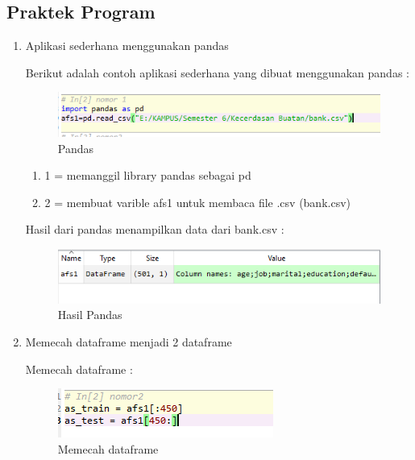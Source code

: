 \subsection{Praktek Program}
\begin{enumerate}
\item Aplikasi sederhana menggunakan pandas
	\par Berikut adalah contoh aplikasi sederhana yang dibuat menggunakan pandas :
	
		\begin{figure}[ht]
		\centering
		\includegraphics[scale=0.5]{figures/AFS/a1.png}
		\caption{Pandas}
		\label{contoh}
		\end{figure}
		
	\begin{enumerate}
	\item 1 = memanggil library pandas sebagai pd
	\item 2 = membuat varible afs1 untuk membaca file .csv (bank.csv)
	\end{enumerate}
	
	\par Hasil dari pandas menampilkan data dari bank.csv :
	
		\begin{figure}[ht]
		\centering
		\includegraphics[scale=0.5]{figures/AFS/a2.png}
		\caption{Hasil Pandas}
		\label{contoh}
		\end{figure}	
	
\item Memecah dataframe menjadi 2 dataframe
	\par Memecah dataframe :
	
		\begin{figure}[ht]
		\centering
		\includegraphics[scale=0.5]{figures/AFS/a3.png}
		\caption{Memecah dataframe}
		\label{contoh}
		\end{figure}
	

\end{enumerate}
